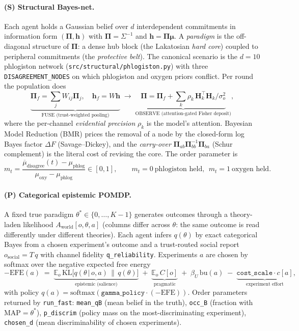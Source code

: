 \documentclass[11pt]{article}
\newcommand{\code}[1]{\texttt{#1}}
\newcommand{\param}[1]{\texttt{#1}}
\newcommand{\Pib}{\boldsymbol{\Pi}}
\newcommand{\hb}{\mathbf{h}}
\newcommand{\thetastar}{\theta^{\!*}}
\newcommand{\mt}{m_t}
\begin{document}
\paragraph{(S) Structural Bayes-net.}
Each agent holds a Gaussian belief over $d$ interdependent commitments in
information form $(\Pib,\hb)$ with $\Pib=\Sigma^{-1}$ and $\hb=\Pib\bm\mu$.
A \emph{paradigm} is the off-diagonal structure of $\Pib$: a dense hub block
(the Lakatosian \emph{hard core}) coupled to peripheral commitments (the
\emph{protective belt}). The canonical scenario is the $d{=}10$ phlogiston
network (\code{src/structural/phlogiston.py}) with three
\code{DISAGREEMENT\_NODES} on which phlogiston and oxygen priors conflict.
Per round the population does
\begin{equation}
\underbrace{\Pib_f=\textstyle\sum_j W_{ij}\Pib_j,\quad \hb_f=W\hb}_{\text{FUSE (trust-weighted pooling)}}
\;\longrightarrow\;
\underbrace{\Pib=\Pib_f+\textstyle\sum_k \rho_k\,\mathbf{H}_k^\top\mathbf{H}_k/\sigma_o^2}_{\text{OBSERVE (attention-gated Fisher deposit)}},
\end{equation}
where the per-channel \emph{evidential precision} $\rho_k$ is the model's
attention. Bayesian Model Reduction (BMR) prices the removal of a node by the
closed-form log Bayes factor $\Delta F$ (Savage--Dickey), and the
\emph{carry-over} $\Pib_{ab}\Pib_{bb}^{-1}\Pib_{ba}$ (Schur complement) is the
literal cost of revising the core. The order parameter is
\begin{equation}
\mt = \frac{\overline{\mu}_{\text{disagree}}(t)-\mu_{\text{phlog}}}{\mu_{\text{oxy}}-\mu_{\text{phlog}}}
\in[0,1],\qquad \mt{=}0\ \text{phlogiston held},\ \ \mt{=}1\ \text{oxygen held}.
\end{equation}

\paragraph{(P) Categorical epistemic POMDP.}
A fixed true paradigm $\thetastar\in\{0,\dots,K-1\}$ generates outcomes through a
theory-laden likelihood $A_{\text{world}}[o,\theta,a]$ (columns differ across
$\theta$: the same outcome is read differently under different theories).
Each agent infers $q(\theta)$ by exact categorical Bayes from a chosen
experiment's outcome and a trust-routed social report
$o_{\text{social}}=T\,q$ with channel fidelity \param{q\_reliability}. Experiments
$a$ are chosen by softmax over the negative expected free energy
\begin{equation}
\label{eq:efe}
-\mathrm{EFE}(a)\;=\;\underbrace{\mathbb{E}_{o}\,\mathrm{KL}\!\big[q(\theta\,|\,o,a)\,\|\,q(\theta)\big]}_{\text{epistemic (salience)}}
\;+\;\underbrace{\mathbb{E}_{o}\,C[o]}_{\text{pragmatic}}
\;+\;\beta_U\,\mathrm{bu}(a)\;-\;\underbrace{\param{cost\_scale}\cdot c[a]}_{\text{experiment effort}},
\end{equation}
with policy $q(a)=\mathrm{softmax}(\param{gamma\_policy}\cdot(-\mathrm{EFE}))$.
Order parameters returned by \code{run\_fast}: \param{mean\_qB} (mean belief in
the truth), \param{occ\_B} (fraction with MAP${=}\thetastar$), \param{p\_discrim}
(policy mass on the most-discriminating experiment), \param{chosen\_d} (mean
discriminability of chosen experiments).
\end{document}
